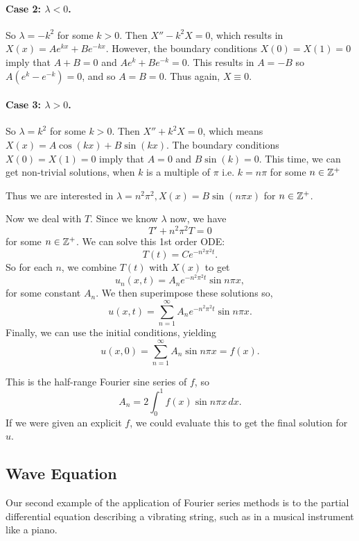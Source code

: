 \paragraph{Case 2: \(\lambda < 0\).}
So \(\lambda = -k^2\) for some \(k > 0\). Then \(X'' -k^2X = 0\), which results in \(X(x) = Ae^{kx} + Be^{-kx}\). However, the boundary conditions \(X(0) = X(1) = 0\) imply that \(A + B = 0\) and \(Ae^k + Be^{-k} = 0\). This results in \(A = -B\) so \(A(e^k - e^{-k}) = 0\), and so \(A = B = 0\). Thus again, \(X \equiv 0\).

\paragraph{Case 3: \(\lambda > 0\).}
So \(\lambda = k^2\) for some \(k > 0\). Then \(X'' + k^2X = 0\), which means \(X(x) = A\cos(kx) + B\sin(kx)\). The boundary conditions \(X(0) = X(1) = 0\) imply that \(A = 0\) and \(B\sin(k) = 0\). This time, we can get non-trivial solutions, when \(k\) is a multiple of \(\pi\) i.e. \(k = n\pi\) for some \(n \in \mathbb{Z}^+\)

Thus we are interested in \(\lambda = n^2\pi^2, X(x) = B\sin(n\pi x)\) for \(n \in \mathbb{Z}^+\).

Now we deal with \(T\). Since we know \(\lambda\) now, we have
\[T' + n^2\pi^2 T = 0\]
for some \(n \in \mathbb{Z}^+\). We can solve this 1st order ODE:
\[T(t) = Ce^{-n^2\pi^2t}.\]
So for each \(n\), we combine \(T(t)\) with \(X(x)\) to get
\[u_n(x, t) = A_n e^{-n^2\pi^2 t} \sin n\pi x,\]
for some constant \(A_n\). We then superimpose these solutions so,
\[u(x, t) = \sum_{n=1}^{\infty} A_n e^{-n^2\pi^2 t} \sin n\pi x.\]
Finally, we can use the initial conditions, yielding
\[u(x, 0) = \sum_{n=1}^{\infty} A_n \sin n\pi x = f(x).\]

This is the half-range Fourier sine series of \(f\), so
\[A_n = 2 \int_0^1 f(x) \sin n\pi x \, dx.\]
If we were given an explicit \(f\), we could evaluate this to get the final solution for \(u\).

\subsection{Wave Equation}
Our second example of the application of Fourier series methods is to the partial differential equation describing a vibrating string, such as in a musical instrument like a piano. \\

